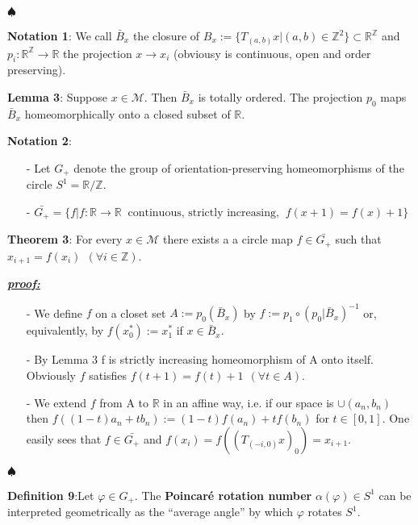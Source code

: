 \documentclass{article}
\begin{document}
	\noindent $\spadesuit$
\color{black}

\noindent \textbf{Notation 1}: We call $\bar{B}_{x}$ the closure of $B_{x} := \{ T_{(a, b)} x | (a, b) \in \mathbb{Z}^{2}  \} \subset \mathbb{R}^{\mathbb{Z}}$ and $p_i: \mathbb{R}^{\mathbb{Z}} \rightarrow \mathbb{R}$ the projection $x \rightarrow x_i$ (obviousy is continuous, open and order preserving).  

\noindent \textbf{Lemma 3}: Suppose $x \in \mathcal{M}$. Then $\bar{B}_{x}$ is totally ordered. The projection $p_0$ maps $\bar{B}_{x}$  homeomorphically onto a closed subset of $\mathbb{R}$.

\noindent \textbf{Notation 2}:
\begin{itemize}
	\item[-]  Let $G_{+}$ denote the group of orientation-preserving homeomorphisms of the circle $S^{1} = \mathbb{R} / \mathbb{Z}$.
	\item[-] $\bar{G_{+}} = \{ f | f : \mathbb{R} \rightarrow \mathbb{R} \ \text{  continuous, strictly increasing, } \ f(x+ 1) = f(x) + 1 \}$
\end{itemize}

\noindent \textbf{Theorem 3}: For every $x \in \mathcal{M}$ there exists a a circle map $f \in \bar{G_{+}}$ such that $x_{i + 1} = f (x_i) \ \ (\forall i \in \mathbb{Z})$.


\color{blue}
	\noindent \underline{\textbf{\textit{proof:}}} 		
		\begin{itemize}
			\item[-] We define $f$ on a closet set $A:= p_{0} ( \bar{B}_{x})$ by $f:= p_{1} \circ (p_{0} | \bar{B}_{x} )^{-1}$ or, equivalently, by $f(x_{0}^{*}) := x_{1}^{*}$ if $x \in \bar{B}_{x}$.
			\item[-] By Lemma 3 f is strictly increasing homeomorphism of A onto itself. Obviously $f$ satisfies $f(t + 1) = f(t) + 1 \ \ (\forall t \in A)$.
			\item[-] We extend $f$ from A to $\mathbb{R}$ in an affine way, i.e. if our space is $\cup (a_n, b_n)$ then $f ( (1 -t)a_n + t b_n) := (1 - t)f(a_n) + t f(b_n)$ for $t \in [0, 1]$. One easily sees that $f \in \bar{G_{+}}$ and $f(x_i) = f ( (T_{(-i, 0)} x)_{0} ) = x_{i + 1}$.
		\end{itemize}
	
	\noindent $\spadesuit$
\color{black}

\noindent \textbf{Definition 9}:Let $\varphi \in G_{+}$. The \textbf{Poincar\'e rotation number} $\alpha( \varphi) \in S^{1}$ can be interpreted geometrically as the ``average angle'' by which $\varphi$ rotates $S^{1}$.
\end{document}
